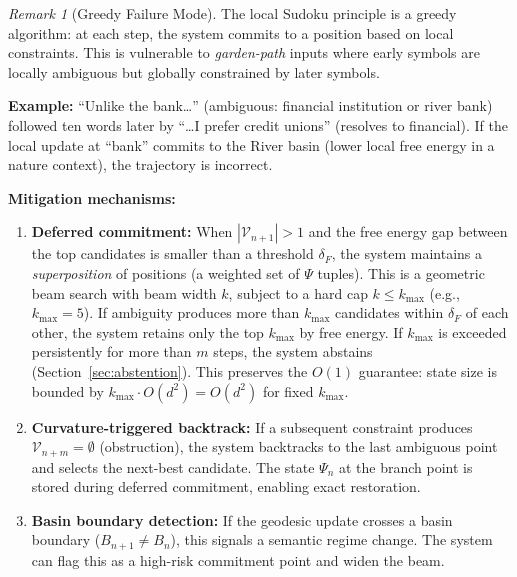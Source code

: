\documentclass[11pt,a4paper]{article}
\theoremstyle{definition}
\theoremstyle{remark}
\newtheorem{remark}[theorem]{Remark}
\begin{document}
\begin{remark}[Greedy Failure Mode]\label{rem:garden_path}
The local Sudoku principle is a greedy algorithm: at each step, 
the system commits to a position based on local constraints. This 
is vulnerable to \emph{garden-path} inputs where early symbols 
are locally ambiguous but globally constrained by later symbols.

\textbf{Example:} ``Unlike the bank\ldots'' (ambiguous: financial 
institution or river bank) followed ten words later by ``\ldots I 
prefer credit unions'' (resolves to financial). If the local update 
at ``bank'' commits to the River basin (lower local free energy in 
a nature context), the trajectory is incorrect.

\textbf{Mitigation mechanisms:}
\begin{enumerate}[nosep]
    \item \textbf{Deferred commitment:} When 
    $|\mathcal{V}_{n+1}| > 1$ and the free energy gap between 
    the top candidates is smaller than a threshold $\delta_F$, 
    the system maintains a \emph{superposition} of positions 
    (a weighted set of $\Psi$ tuples). This is a geometric beam 
    search with beam width $k$, subject to a hard cap 
    $k \leq k_{\max}$ (e.g., $k_{\max} = 5$). If ambiguity 
    produces more than $k_{\max}$ candidates within $\delta_F$ 
    of each other, the system retains only the top $k_{\max}$ 
    by free energy. If $k_{\max}$ is exceeded persistently 
    for more than $m$ steps, the system abstains 
    (Section~\ref{sec:abstention}). This preserves the $O(1)$ 
    guarantee: state size is bounded by 
    $k_{\max} \cdot O(d^2) = O(d^2)$ for fixed $k_{\max}$.
    
    \item \textbf{Curvature-triggered backtrack:} If a subsequent 
    constraint produces $\mathcal{V}_{n+m} = \emptyset$ 
    (obstruction), the system backtracks to the last ambiguous 
    point and selects the next-best candidate. The state $\Psi_n$ 
    at the branch point is stored during deferred commitment, 
    enabling exact restoration.
    
    \item \textbf{Basin boundary detection:} If the geodesic 
    update crosses a basin boundary ($B_{n+1} \neq B_n$), this 
    signals a semantic regime change. The system can flag this as 
    a high-risk commitment point and widen the beam.
\end{enumerate}
\end{remark}
\end{document}
